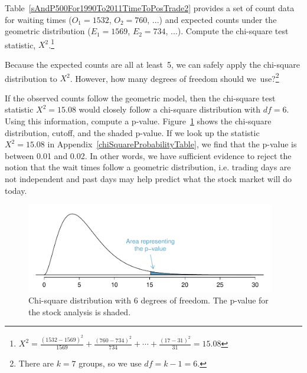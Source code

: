 \begin{exercise}
Table~\ref{sAndP500For1990To2011TimeToPosTrade2} provides a set of count data for waiting times ($O_1=1532$, $O_2=760$, ...) and expected counts under the geometric distribution ($E_1=1569$, $E_2=734$, ...). Compute the chi-square test statistic, $X^2$.\footnote{$X^2=\frac{(1532-1569)^2}{1569} + \frac{(760-734)^2}{734} + \cdots + \frac{(17-31)^2}{31} = 15.08$}
\end{exercise}

\begin{exercise}
Because the expected counts are all at least~5, we can safely apply the chi-square distribution to $X^2$. However, how many degrees of freedom should we~use?\footnote{There are $k=7$ groups, so we use $df=k-1=6$.}
\end{exercise}

\begin{example}{If the observed counts follow the geometric model, then the chi-square test statistic $X^2=15.08$ would closely follow a chi-square distribution with $df=6$. Using this information, compute a p-value.} \label{RejectGeomModelForSP500StockDataFor1990To2011}
Figure~\ref{geomFitPValueForSP500For1990To2011} shows the chi-square distribution, cutoff, and the shaded p-value. If we look up the statistic $X^2=15.08$ in Appendix~\ref{chiSquareProbabilityTable}, we find that the p-value is between 0.01 and 0.02. In other words, we have sufficient evidence to reject the notion that the wait times follow a geometric distribution, i.e. trading days are not independent and past days may help predict what the stock market will do today.
\end{example}

\begin{figure}
\centering
\includegraphics[width=0.97\textwidth]{ch_inference_for_props/figures/geomFitPValueForSP500For1990To2011/geomFitPValueForSP500For1990To2011}
\caption{Chi-square distribution with 6 degrees of freedom. The p-value for the stock analysis is shaded.}
\label{geomFitPValueForSP500For1990To2011}
\end{figure}

